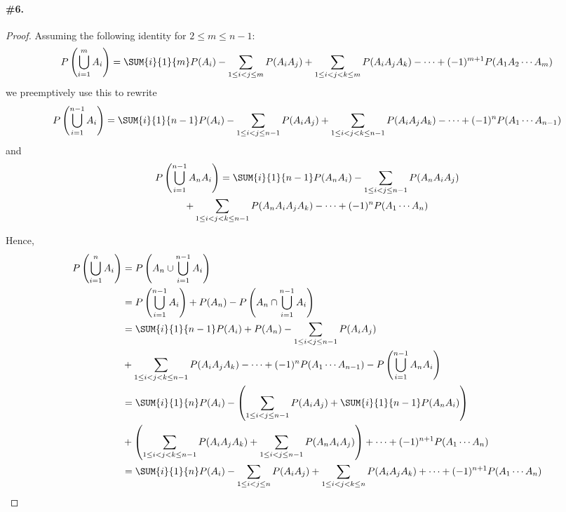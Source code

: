 \documentclass[12pt,titlepage]{article}
\begin{document}
\paragraph{\#6.}
\begin{proof}
Assuming the following identity for $2 \leq m \leq n-1$:
\[
P\left(\bigcup_{i=1}^m A_i \right) = \SUM{i}{1}{m} P(A_i) - \sum_{1 \leq i < j \leq m} P(A_i A_j) + \sum_{1 \leq i < j < k \leq m} P(A_i A_j A_k) - \cdots + (-1)^{m+1} P(A_1 A_2 \cdots A_{m})
\]
we preemptively use this to rewrite
\begin{align*}
P\left(\bigcup_{i=1}^{n-1} A_i \right) = \SUM{i}{1}{n-1} P(A_i) - \sum_{1 \leq i < j \leq n-1} P(A_i A_j) + \sum_{1 \leq i < j < k \leq n-1} P(A_i A_j A_k) - \cdots + (-1)^{n} P(A_1 \cdots A_{n-1})
\end{align*}
and 
\begin{multline*}
P\left(\bigcup_{i=1}^{n-1} A_nA_i \right) = \SUM{i}{1}{n-1} P(A_n A_i) - \sum_{1 \leq i < j \leq n-1} P(A_n A_i A_j) \\
+ \sum_{1 \leq i < j < k \leq n-1} P(A_n A_i A_j A_k) - \cdots + (-1)^{n} P(A_1 \cdots A_{n})
\end{multline*}

Hence,
\begin{align*}
P\left(\bigcup_{i=1}^{n} A_i\right) &= P\left( A_n \cup \bigcup_{i=1}^{n-1} A_i \right) \\
&= P\left(\bigcup_{i=1}^{n-1} A_i \right) + P(A_n) - P\left(A_n \cap \bigcup_{i=1}^{n-1} A_i \right) \\
&= \SUM{i}{1}{n-1} P(A_i) + P(A_n) - \sum_{1 \leq i < j \leq n-1} P(A_i A_j) \\
&+ \sum_{1 \leq i < j < k \leq n-1} P(A_i A_j A_k) - \cdots + (-1)^{n} P(A_1 \cdots A_{n-1}) - P\left(\bigcup_{i=1}^{n-1} A_n A_i \right) \\
&= \SUM{i}{1}{n} P(A_i) - \left(  \sum_{1 \leq i < j \leq n-1} P(A_i A_j)  + \SUM{i}{1}{n-1} P(A_n A_i) \right) \\
&+ \left( \sum_{1 \leq i < j < k \leq n-1} P(A_i A_j A_k)  +\sum_{1 \leq i < j \leq n-1} P(A_n A_i A_j) \right) + \cdots + (-1)^{n+1} P(A_1 \cdots A_n) \\
&=  \SUM{i}{1}{n} P(A_i) - \sum_{1 \leq i < j \leq n} P(A_i A_j) +  \sum_{1 \leq i < j < k \leq n} P(A_i A_j A_k) + \cdots + (-1)^{n+1} P(A_1 \cdots A_n)
\end{align*}
\end{proof}
\end{document}
